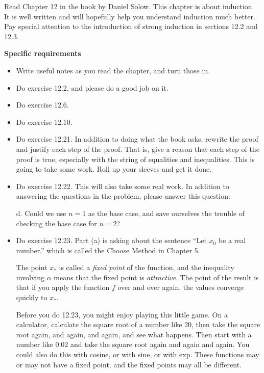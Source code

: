 
Read Chapter 12 in the book by Daniel Solow.
This chapter is about induction.
It is well written and will hopefully help you understand induction much better.
Pay special attention to the introduction of strong induction in sections 12.2 and 12.3.

\vspace{0.1in}
\noindent
{\bf Specific requirements}

\begin{itemize}
\item Write useful notes as you read the chapter, and turn those in.

\item Do exercise 12.2, and please do a good job on it.

\item Do exercise 12.6.

\item Do exercise 12.10.

\item Do exercise 12.21.  In addition to doing what the book asks, rewrite the proof and justify each step of the proof.
That is, give a reason that each step of the proof is true, especially with the string of equalities and inequalities.
This is going to take some work.
Roll up your sleeves and get it done.

\item Do exercise 12.22.  This will also take some real work.
In addition to answering the questions in the problem, please answer this question:

d. Could we use $n=1$ as the base case, and save ourselves the trouble of checking the base case for $n=2$?

\item Do exercise 12.23.  
Part (a) is asking about the sentence ``Let $x_0$ be a real number.'' which is called the Choose Method in Chapter 5.

The point $x_*$ is called a {\em fixed point} of the function, and the inequality involving $\alpha$ means that the fixed point is {\em attractive}.  
The point of the result is that if you apply the function $f$ over and over again, the values converge quickly to $x_*$.

Before you do 12.23, you might enjoy playing this little game.
On a calculator, calculate the square root of a number like 20, then take the square root again, and again, and again, and see what happens.
Then start with a number like 0.02 and take the square root again and again and again.
You could also do this with cosine, or with sine, or with exp.
These functions may or may not have a fixed point, and the fixed points may all be different.


\end{itemize}
